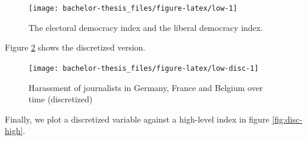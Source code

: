 \documentclass[]{report}
\newenvironment{Shaded}{\begin{snugshade}}{\end{snugshade}}
\newcommand{\KeywordTok}[1]{\textcolor[rgb]{0.13,0.29,0.53}{\textbf{#1}}}
\newcommand{\DataTypeTok}[1]{\textcolor[rgb]{0.13,0.29,0.53}{#1}}
\newcommand{\StringTok}[1]{\textcolor[rgb]{0.31,0.60,0.02}{#1}}
\newcommand{\OperatorTok}[1]{\textcolor[rgb]{0.81,0.36,0.00}{\textbf{#1}}}
\newcommand{\NormalTok}[1]{#1}
\theoremstyle{definition}
\theoremstyle{definition}
\theoremstyle{definition}
\theoremstyle{remark}
\begin{document}
\begin{figure}

{\centering \texttt{[image: bachelor-thesis\_files/figure-latex/low-1]} 

}

\caption{The electoral democracy index and the liberal democracy index.}\label{fig:low}
\end{figure}

Figure \ref{fig:low-disc} shows the discretized version.

\begin{Shaded}
\end{Shaded}

\begin{figure}

{\centering \texttt{[image: bachelor-thesis\_files/figure-latex/low-disc-1]} 

}

\caption{Harassment of journalists in Germany, France and Belgium over time (discretized)}\label{fig:low-disc}
\end{figure}

Finally, we plot a discretized variable against a high-level index in
figure \ref{fig:disc-high}.

\begin{Shaded}
\end{Shaded}
\end{document}
